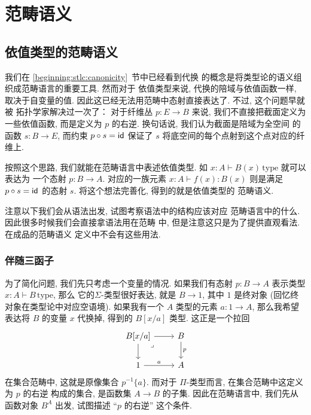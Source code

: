 \chapter{范畴语义}
\section{依值类型的范畴语义}
我们在 \ref{beginning:stlc:canonicity}~节中已经看到代换
的概念是将类型论的语义组织成范畴语言的重要工具. 然而对于
依值类型来说, 代换的陪域与依值函数一样, 取决于自变量的值.
因此这已经无法用范畴中态射直接表达了. 不过, 这个问题早就被
拓扑学家解决过一次了： 对于纤维丛 \(p : E \to B\)
来说, 我们不直接把截面定义为一些依值函数, 而是定义为
\(p\) 的右逆. 换句话说, 我们认为截面是陪域为全空间
的函数 \(s : B \to E\), 而约束 \(p \circ s = \textnormal{\textsf{id}}\)
保证了 \(s\) 将底空间的每个点射到这个点对应的纤维上.

按照这个思路, 我们就能在范畴语言中表述依值类型. 如
\(x{:}A \vdash B(x)\,\text{type}\) 就可以表达为
一个态射 \(p : B \to A\). 对应的一族元素
\(x{:}A \vdash f(x) : B(x)\) 则是满足 \(p \circ s = \textnormal{\textsf{id}}\)
的态射 \(s\). 将这个想法完善化, 得到的就是依值类型的
范畴语义.

注意以下我们会从语法出发, 试图考察语法中的结构应该对应
范畴语言中的什么. 因此很多时候我们会直接拿语法用在范畴
中, 但是注意这只是为了提供直观看法. 在成品的范畴语义
定义中不会有这些用法.

\subsection{伴随三函子}
为了简化问题, 我们先只考虑一个变量的情况.
如果我们有态射 \(p : B \to A\) 表示类型
\(x{:}A \vdash B\,\text{type}\), 那么
它的\(\Sigma\)-类型很好表达, 就是 \(B \to 1\),
其中 \(1\) 是终对象 (回忆终对象在类型论中对应空语境).
如果我有一个 \(A\) 类型的元素 \(a : 1 \to A\),
那么我希望表达将 \(B\) 的变量 \(x\) 代换掉, 得到的
\(B[x/a]\) 类型. 这正是一个拉回
\[\begin{tikzcd}
  B[x/a] & B \\
  1 & A
  \arrow["a", from=2-1, to=2-2]
  \arrow["p", from=1-2, to=2-2]
  \arrow[from=1-1, to=2-1]
  \arrow[from=1-1, to=1-2]
  \arrow["\lrcorner"{anchor=center, pos=0.125}, draw=none, from=1-1, to=2-2]
\end{tikzcd}\]
在集合范畴中, 这就是原像集合 \(p^{-1}\{a\}\). 而对于
\(\Pi\)-类型而言, 在集合范畴中这定义为 \(p\) 的右逆
构成的集合, 是函数集 \(A \to B\) 的子集. 因此在范畴语言中,
我们先从函数对象 \(B^A\) 出发, 试图描述 “\(p\) 的右逆” 这个条件.

